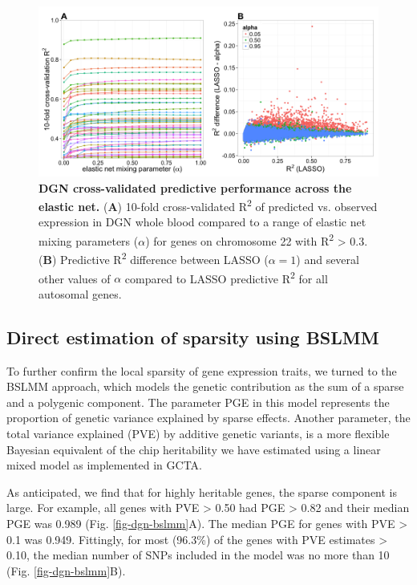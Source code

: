 \documentclass[10pt,letterpaper]{article}
\begin{document}
\begin{figure}[h]
\includegraphics[width=12cm]{Figures/Fig-DGN-EN.png}
\caption{{\bf DGN cross-validated predictive performance across the elastic net.} 
(\textbf{A}) 10-fold cross-validated R\textsuperscript{2} of
predicted vs. observed expression in DGN whole blood compared to a range
of elastic net mixing parameters (\(\alpha\)) for genes on chromosome 22
with R\textsuperscript{2} \textgreater{} 0.3. (\textbf{B}) Predictive
R\textsuperscript{2} difference between LASSO (\(\alpha = 1\)) and
several other values of \(\alpha\) compared to LASSO predictive
R\textsuperscript{2} for all autosomal genes.}
\label{fig-dgn-en}
\end{figure}

\subsection*{Direct estimation of sparsity using BSLMM}

To further confirm the local sparsity of gene expression traits, we turned to the BSLMM \cite{Zhou_2013} approach, which models the genetic contribution as the sum of a sparse and a polygenic component. The parameter PGE in this model represents the proportion of genetic variance explained by sparse effects. Another parameter, the total variance explained (PVE) by additive genetic variants, is a more flexible Bayesian equivalent of the chip heritability we have estimated using a linear mixed model as implemented in GCTA. 

As anticipated, we find that for highly heritable genes, the sparse component is large. For example, all genes with PVE \textgreater{} 0.50 had PGE \textgreater{} 0.82 and their median PGE was 0.989 (Fig. \ref{fig-dgn-bslmm}A). The median PGE for genes with PVE \textgreater{} 0.1 was 0.949. Fittingly, for most (96.3\%) of the genes with PVE estimates \textgreater{} 0.10, the median number of SNPs included in the model was no more than 10 (Fig. \ref{fig-dgn-bslmm}B).
\end{document}
